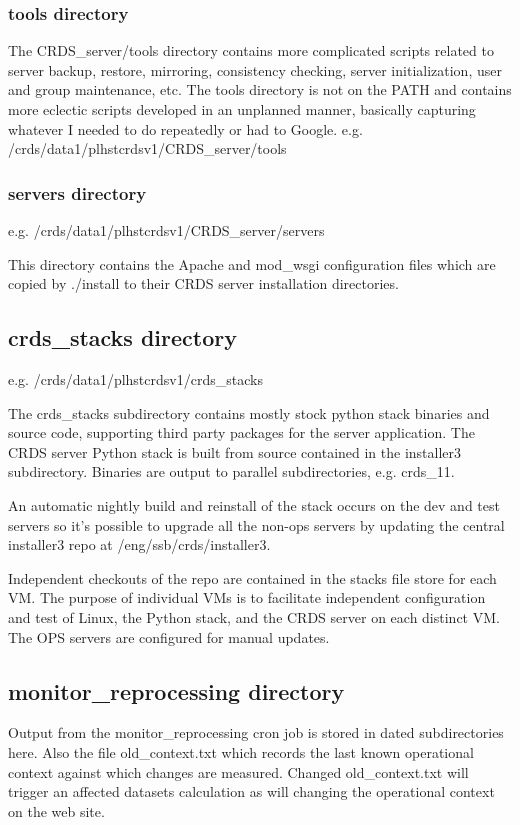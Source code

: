 \documentclass[letterpaper,10pt,english]{sphinxmanual}
\begin{document}
\subsubsection{tools directory}
\label{server_guide:tools-directory}
The CRDS\_server/tools directory contains more complicated scripts related to server backup, restore, mirroring,
consistency checking, server initialization, user and group maintenance, etc.   The tools directory is not on the
PATH and contains more eclectic scripts developed in an unplanned manner,  basically capturing whatever I needed
to do repeatedly or had to Google.   e.g. /crds/data1/plhstcrdsv1/CRDS\_server/tools


\subsubsection{servers directory}
\label{server_guide:servers-directory}
e.g. /crds/data1/plhstcrdsv1/CRDS\_server/servers

This directory contains the Apache and mod\_wsgi configuration files which are copied by ./install to their CRDS
server installation directories.


\subsection{crds\_stacks directory}
\label{server_guide:crds-stacks-directory}
e.g. /crds/data1/plhstcrdsv1/crds\_stacks

The crds\_stacks subdirectory contains mostly stock python stack binaries and source code,  supporting third party packages
for the server application.  The CRDS server Python stack is built from source contained in the installer3 subdirectory.
Binaries are output to parallel subdirectories,  e.g. crds\_11.

An automatic nightly build and reinstall of the stack occurs on the dev and test servers so it's possible to upgrade all
the non-ops servers by updating the central installer3 repo at /eng/ssb/crds/installer3.

Independent checkouts of the repo are contained in the stacks file store for each VM. The purpose of individual VMs is
to facilitate independent configuration and test of Linux, the Python stack, and the CRDS server on each distinct VM.
The OPS servers are configured for manual updates.


\subsection{monitor\_reprocessing directory}
\label{server_guide:monitor-reprocessing-directory}
Output from the monitor\_reprocessing cron job is stored in dated subdirectories here.  Also the file old\_context.txt
which records the last known operational context against which changes are measured.  Changed old\_context.txt will
trigger an affected datasets calculation as will changing the operational context on the web site.
\end{document}
